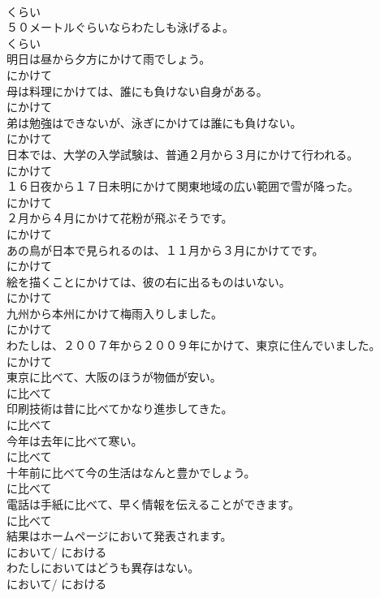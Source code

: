 \documentclass[8pt]{extreport}
\begin{document}
\begin{CJK}{UTF8}{min}
\\	くらい
\\	５０メートルぐらいならわたしも泳げるよ。	
\\	くらい
\\	明日は昼から夕方にかけて雨でしょう。	
\\	にかけて
\\	母は料理にかけては、誰にも負けない自身がある。	
\\	にかけて
\\	弟は勉強はできないが、泳ぎにかけては誰にも負けない。	
\\	にかけて
\\	日本では、大学の入学試験は、普通２月から３月にかけて行われる。	
\\	にかけて
\\	１６日夜から１７日未明にかけて関東地域の広い範囲で雪が降った。	
\\	にかけて
\\	２月から４月にかけて花粉が飛ぶそうです。	
\\	にかけて
\\	あの鳥が日本で見られるのは、１１月から３月にかけてです。	
\\	にかけて
\\	絵を描くことにかけては、彼の右に出るものはいない。	
\\	にかけて
\\	九州から本州にかけて梅雨入りしました。	
\\	にかけて
\\	わたしは、２００７年から２００９年にかけて、東京に住んでいました。	
\\	にかけて
\\	東京に比べて、大阪のほうが物価が安い。	
\\	に比べて
\\	印刷技術は昔に比べてかなり進歩してきた。	
\\	に比べて
\\	今年は去年に比べて寒い。	
\\	に比べて
\\	十年前に比べて今の生活はなんと豊かでしょう。	
\\	に比べて
\\	電話は手紙に比べて、早く情報を伝えることができます。	
\\	に比べて
\\	結果はホームページにおいて発表されます。	
\\	において/ における
\\	わたしにおいてはどうも異存はない。	
\\	において/ における

\end{CJK}
\end{document}
